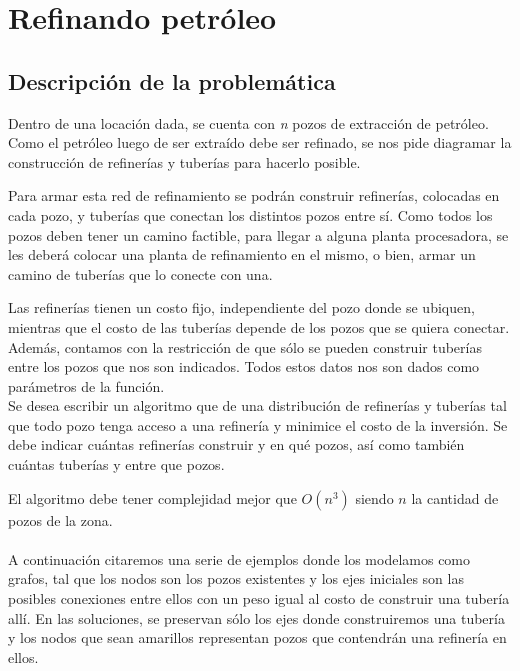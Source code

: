 \section{Refinando petr\'oleo}
\subsection{Descripci\'on de la problem\'atica}

Dentro de una locaci\'on dada, se cuenta con \emph{n} pozos de extracci\'on de petr\'oleo. Como el petr\'oleo luego de ser extra\'ido debe ser refinado, se nos pide diagramar la construcci\'on de refiner\'ias y tuber\'ias para hacerlo posible.

Para armar esta red de refinamiento se podr\'an construir refiner\'ias, colocadas en cada pozo, y tuber\'ias que conectan los distintos pozos entre s\'i. Como todos los pozos deben tener un camino factible, para llegar a alguna planta procesadora, se les deber\'a colocar una planta de refinamiento en el mismo, o bien, armar un camino de tuber\'ias que lo conecte con una.
 
	Las refiner\'ias tienen un costo fijo, independiente del pozo donde se ubiquen, mientras que el costo de las tuber\'ias depende de los pozos que se quiera conectar. Adem\'as, contamos con la restricci\'on de que s\'olo se pueden construir tuber\'ias entre los pozos que nos son indicados. Todos estos datos nos son dados como par\'ametros de la funci\'on.\\

	Se desea escribir un algoritmo que de una distribuci\'on de refiner\'ias y tuber\'ias tal que todo pozo tenga acceso a una refiner\'ia y minimice el costo de la inversi\'on. Se debe indicar cu\'antas refiner\'ias construir y en qu\'e pozos, as\'i como tambi\'en cu\'antas tuber\'ias y entre que pozos.

	El algoritmo debe tener complejidad mejor que $O(n^3)$ siendo $n$ la cantidad de pozos de la zona.\\
\\

	A continuaci\'on citaremos una serie de ejemplos donde los modelamos como grafos, tal que los nodos son los pozos existentes y los ejes iniciales son las posibles conexiones entre ellos con un peso igual al costo de construir una tuber\'ia all\'i. En las soluciones, se preservan s\'olo los ejes donde construiremos una tuber\'ia y los nodos que sean amarillos representan pozos que contendr\'an una refiner\'ia en ellos.\\
	
